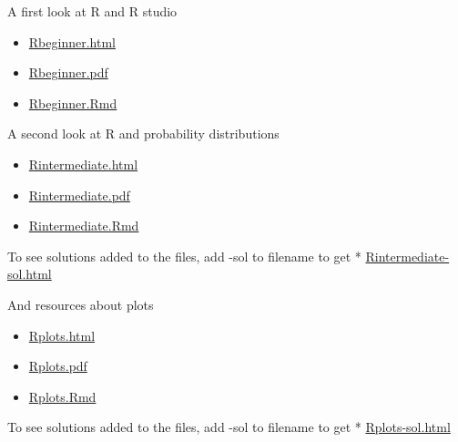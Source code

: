 \documentclass[10pt,ignorenonframetext,]{beamer}
\providecommand{\tightlist}{%
  \setlength{\itemsep}{0pt}\setlength{\parskip}{0pt}}
\begin{document}
\begin{frame}

\begin{block}{A first look at R and R studio}

\begin{itemize}
\tightlist
\item
  \href{https://www.math.ntnu.no/emner/TMA4268/2019v/1Intro/Rbeginner.html}{Rbeginner.html}
\item
  \href{https://www.math.ntnu.no/emner/TMA4268/2019v/1Intro/Rbeginner.pdf}{Rbeginner.pdf}
\item
  \href{https://www.math.ntnu.no/emner/TMA4268/2019v/1Intro/Rbeginner.Rmd}{Rbeginner.Rmd}
\end{itemize}

\end{block}

\end{frame}

\begin{frame}

\begin{block}{A second look at R and probability distributions}

\begin{itemize}
\tightlist
\item
  \href{https://www.math.ntnu.no/emner/TMA4268/2019v/1Intro/Rintermediate.html}{Rintermediate.html}
\item
  \href{https://www.math.ntnu.no/emner/TMA4268/2019v/1Intro/Rintermediate.pdf}{Rintermediate.pdf}
\item
  \href{https://www.math.ntnu.no/emner/TMA4268/2019v/1Intro/Rintermediate.Rmd}{Rintermediate.Rmd}
\end{itemize}

To see solutions added to the files, add -sol to filename to get *
\href{https://www.math.ntnu.no/emner/TMA4268/2019v/1Intro/Rintermediate-sol.html}{Rintermediate-sol.html}

\end{block}

\begin{block}{And resources about plots}

\begin{itemize}
\tightlist
\item
  \href{https://www.math.ntnu.no/emner/TMA4268/2019v/1Intro/Rplots.html}{Rplots.html}
\item
  \href{https://www.math.ntnu.no/emner/TMA4268/2019v/1Intro/Rplots.pdf}{Rplots.pdf}
\item
  \href{https://www.math.ntnu.no/emner/TMA4268/2019v/1Intro/Rplots.Rmd}{Rplots.Rmd}
\end{itemize}

To see solutions added to the files, add -sol to filename to get *
\href{https://www.math.ntnu.no/emner/TMA4268/2019v/1Intro/Rplots-sol.html}{Rplots-sol.html}

\end{block}

\end{frame}
\end{document}
